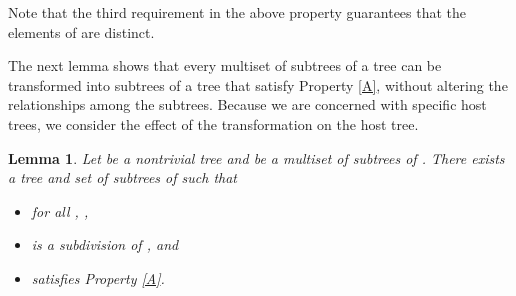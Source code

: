 \documentclass[
final
]{dmtcs-episciences}        \usepackage{graphics, amsthm, amsmath, amssymb, algorithm, algorithmic}
\newtheorem{lemma}{Lemma}
\begin{document}
Note that the third requirement in the above property guarantees that the elements of  are distinct.

The next lemma shows that every multiset of subtrees of a tree can be transformed into subtrees of a tree that satisfy Property \ref{A}, without altering the relationships among the subtrees.
Because we are concerned with specific host trees, we consider the effect of the transformation on the host tree.


\begin{lemma} \label{lem:bushyGivesNice}
Let  be a nontrivial tree and  be a multiset of subtrees of .
There exists a tree  and set  of subtrees of  such that
\begin{itemize}
\item
for all , ,
\item
 is a subdivision of ,
and
\item
 satisfies Property \ref{A}.
\end{itemize}
\end{lemma}
\end{document}
